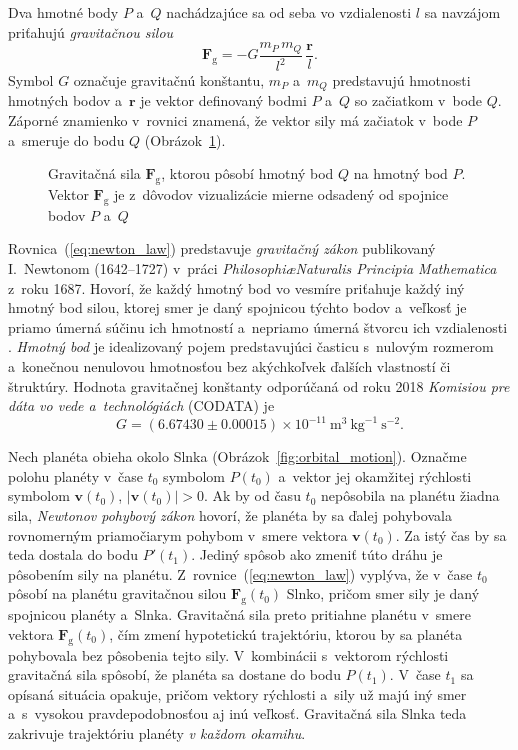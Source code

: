 \documentclass[a4paper, 12pt]{book}
\newcommand{\gidx}{\mathrm g}
\let\vec\mathbf
\begin{document}
Dva hmotné body $P$ a~$Q$ nachádzajúce sa od seba vo vzdialenosti $l$ sa 
navzájom priťahujú \emph{gravitačnou silou}
%
\begin{equation}
\label{eq:newton_law}
\vec F_\gidx = -G \frac{m_P \, m_Q}{l^2} \, \frac{\vec r}{l}{.}
\end{equation}
%
Symbol $G$ označuje gravitačnú konštantu, $m_P$ a~$m_Q$ predstavujú hmotnosti 
hmotných bodov a~$\vec r$ je vektor definovaný bodmi $P$ a~$Q$ so začiatkom 
v~bode $Q$.  Záporné znamienko v~rovnici znamená, že vektor sily má začiatok 
v~bode $P$ a~smeruje do bodu $Q$ (Obrázok~\ref{fig:newton_law}).

\begin{figure}[b]
\centering

\caption{Gravitačná sila $\vec F_\gidx$, ktorou pôsobí hmotný bod $Q$ na hmotný 
bod $P$.  Vektor $\vec F_\gidx$ je z~dôvodov vizualizácie mierne odsadený od 
spojnice bodov $P$ a~$Q$}
\label{fig:newton_law}
\end{figure}

Rovnica~(\ref{eq:newton_law}) predstavuje \emph{gravitačný zákon} publikovaný 
I.~Newtonom (1642--1727) v~práci \emph{Philosophi\ae Naturalis Principia 
Mathematica} z~roku 1687.  Hovorí, že každý hmotný bod vo vesmíre priťahuje 
každý iný hmotný bod silou, ktorej smer je daný spojnicou týchto bodov 
a~veľkosť je priamo úmerná súčinu ich hmotností a~nepriamo úmerná štvorcu ich 
vzdialenosti \citep{Kellogg1967}.  \emph{Hmotný bod} je idealizovaný pojem 
predstavujúci časticu s~nulovým rozmerom a~konečnou nenulovou hmotnosťou bez 
akýchkoľvek ďalších vlastností či štruktúry.  Hodnota gravitačnej konštanty 
odporúčaná od roku 2018 \emph{Komisiou pre dáta vo vede a~technológiách} 
(CODATA) je
%
\begin{equation}
G = (6.67430 \pm 0.00015) \times 10^{-11} \ \mathrm{m}^3 \ \mathrm{kg}^{-1} 
\ \mathrm{s}^{-2}{.}
\end{equation}

Nech planéta obieha okolo Slnka (Obrázok~\ref{fig:orbital_motion}).  Označme 
polohu planéty v~čase $t_0$ symbolom $P(t_0)$ a~vektor jej okamžitej rýchlosti 
symbolom $\vec v(t_0)$, $| \vec v(t_0) | > 0$.  Ak by od času $t_0$ nepôsobila 
na planétu žiadna sila, \emph{Newtonov pohybový zákon} hovorí, že planéta by sa 
ďalej pohybovala rovnomerným priamočiarym pohybom v~smere vektora $\vec 
v(t_0)$.  Za istý čas by sa teda dostala do bodu $P'(t_1)$.  Jediný spôsob ako 
zmeniť túto dráhu je pôsobením sily na planétu.  
Z~rovnice~(\ref{eq:newton_law}) vyplýva, že v~čase $t_0$ pôsobí na planétu 
gravitačnou silou $\vec F_\gidx(t_0)$ Slnko, pričom smer sily je daný spojnicou 
planéty a~Slnka.  Gravitačná sila preto pritiahne planétu v~smere vektora $\vec 
F_\gidx(t_0)$, čím zmení hypotetickú trajektóriu, ktorou by sa planéta 
pohybovala bez pôsobenia tejto sily.  V~kombinácii s~vektorom rýchlosti 
gravitačná sila spôsobí, že planéta sa dostane do bodu $P(t_1)$.  V~čase $t_1$ 
sa opísaná situácia opakuje, pričom vektory rýchlosti a~sily už majú iný smer 
a~s~vysokou pravdepodobnosťou aj inú veľkosť.  Gravitačná sila Slnka teda 
zakrivuje trajektóriu planéty \emph{v každom okamihu}.
\end{document}
